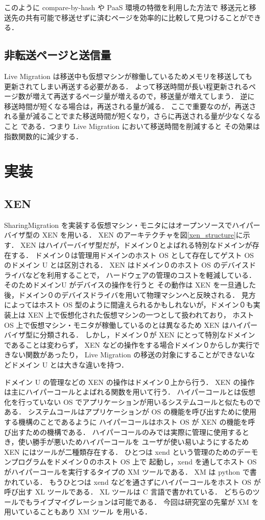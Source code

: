 \documentclass[graduation-thesis]{mlarticle}
\begin{document}
このように compare-by-hash や PaaS 環境の特徴を利用した方法で
移送元と移送先の共有可能で移送せずに済むページを効率的に比較して見つけることができる．


\subsection{非転送ページと送信量}
\label{sec-4-4}
Live Migration は移送中も仮想マシンが稼働しているためメモリを移送しても
更新されてしまい再送する必要がある．
よって移送時間が長い程更新されるページ数が増えて再送するページ量が増えるので，移送量が増えてしまう．
逆に移送時間が短くなる場合は，再送される量が減る．
ここで重要なのが，再送される量が減ることでまた移送時間が短くなり，さらに再送される量が少なくなること
である．つまり Live Migration において移送時間を削減すると
その効果は指数関数的に減少する．


\clearpage
\section{実装}
\label{sec-5}
\subsection{XEN}
\label{sec-5-1}
SharingMigration を実装する仮想マシン・モニタにはオープンソースでハイパーバイザ型の XEN を用いる．
XEN のアーキテクチャを図\ref{xen_structure}に示す．
XEN はハイパーバイザ型だが，ドメイン０とよばれる特別なドメインが存在する．
ドメイン０は管理用ドメインのホスト OS として存在してゲスト OS のドメイン U とは区別される．
XEN はドメイン０のホスト OS のデバイスドライバなどを利用することで，
ハードウェアの管理のコストを軽減している．そのためドメインU がデバイスの操作を行うと
その動作は XEN を一旦通した後，ドメイン０のデバイスドライバを用いて物理マシンへと反映される．
見方によってはホスト OS 型のように間違えられるかもしれないが，ドメイン０も実装上は
XEN 上で仮想化された仮想マシンの一つとして扱われており，
ホスト OS 上で仮想マシン・モニタが稼働しているのとは異なるため
XEN はハイパーバイザ型に分類される．
しかし，ドメイン０が XEN にとって特別なドメインであることは変わらず，
XEN などの操作をする場合ドメイン０からしか実行できない関数があったり，
Live Migration の移送の対象にすることができないなどドメイン U とは大きな違いを持つ．

ドメイン U の管理などの XEN の操作はドメイン０上から行う．
XEN の操作は主にハイパーコールとよばれる関数を用いて行う．
ハイパーコールとは仮想化を行っていない OS でアプリケーションが用いるシステムコールと似たものである．
システムコールはアプリケーションが OS の機能を呼び出すために使用する機構のことであるように
ハイパーコールはホスト OS が XEN の機能を呼び出すための機構である．
ハイパーコールのみでは実際に管理に使用するとき，使い勝手が悪いためハイパーコールを
ユーザが使い易いようにするため XEN にはツールが二種類存在する．
ひとつは xend という管理のためのデーモンプログラムをドメイン０のホスト OS 上で
起動し，xend を通してホスト OS がハイパーコールを実行するタイプの XM ツールである．
XM は python で書かれている．
もうひとつは xend などを通さずにハイパーコールをホスト OS が呼び出す XL ツールである．
XL ツールは C 言語で書かれている．
どちらのツールでもライブマイグレーションは可能である．
今回は研究室の先輩が XM を用いていることもあり XM ツール
を用いる．
\end{document}
